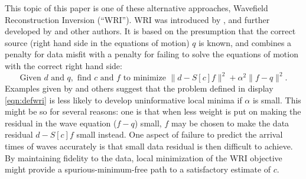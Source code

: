 This topic of this paper is one of these alternative approaches,
Wavefield Reconstruction Inversion (``WRI''). WRI was introduced by \cite{LeeuwenHerrmannWRI:13}, and further
developed by \cite{LeeuwenHerrmann:16,WangYingst:SEG16} and other
authors. It is based on the presumption that the correct source (right
hand side in the equations of motion) $q$ is
known, and combines a penalty for data misfit with a penalty for
failing to solve the equations of motion with the correct right hand side:
\begin{equation}
  \label{eqn:defwri}
  \mbox{Given } d \mbox{ and }q, \mbox{ find }c \mbox{ and }f \mbox{ to
    minimize }
  \|d -  S[c]f\|^2+\alpha^2\|f-q\|^2.
\end{equation}
Examples given
by \cite{LeeuwenHerrmannWRI:13} and others suggest that the problem
defined in display \ref{eqn:defwri} is less likely to develop
uninformative local minima if $\alpha$ is small. This might be so for
several reasons: one is that when less weight is
put on making the residual in the wave equation ($f-q$) small, 
$f$ may be chosen to make the data residual $d-S[c]f$ small
instead. One aspect of failure to predict the arrival times of waves
accurately is that small data residual is then difficult to
achieve. By maintaining fidelity to
the data, local minimization of the WRI objective might provide a
spurious-minimum-free path to a satisfactory estimate of $c$. 

